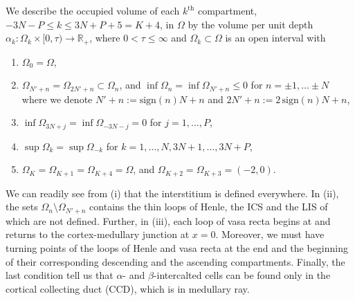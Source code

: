 \documentclass{article}
\begin{document}
We describe the occupied volume of each $k^{\mathrm{th}}$ compartment, $-3N-P\leq k\leq 3N+P+5=K+4$, in $\Omega$ by the volume per unit depth $\alpha_k:\Omega_k\times [0,\tau)\to \mathbb{R}_+$, where $0<\tau\leq \infty$ and $\Omega_k\subset\Omega$ is an open interval with 
\begin{enumerate}[label=(\roman*)]
    \item $\Omega_0=\Omega$,
    \item $\Omega_{N'+n} = \Omega_{2N'+n}\subset \Omega_n$, and $\inf\Omega_n = \inf\Omega_{N'+n}\leq 0$ for $n=\pm 1,\dots\pm N$ where we denote $N'+n := \mathrm{sign}(n)N+n$ and $2N'+n := 2\, \mathrm{sign}(n)N+n$,
    \item $\inf \Omega_{3N+j} = \inf \Omega_{-3N-j}=0$ for $j=1,\dots,P$, 
    \item $\sup\Omega_k = \sup\Omega_{-k}$ for $k=1,\dots,N,3N+1,\dots,3N+P$,
    \item $\Omega_K = \Omega_{K+1} = \Omega_{K+4} = \Omega$, and $\Omega_{K+2}=\Omega_{K+3}=(-2,0)$.
\end{enumerate}
We can readily see from (i) that the interstitium is defined everywhere.
In (ii), the sets $\Omega_n\setminus \Omega_{N'+n}$ contains the thin loops of Henle, the ICS and the LIS of which are not defined.
Further, in (iii), each loop of vasa recta begins at and returns to the cortex-medullary junction at $x=0$.
Moreover, we must have turning points of the loops of Henle and vasa recta at the end and the beginning of their corresponding descending and the ascending compartments.
Finally, the last condition tell us that $\alpha$- and $\beta$-intercalted cells can be found only in the cortical collecting duct (CCD), which is in medullary ray.

\end{document}
